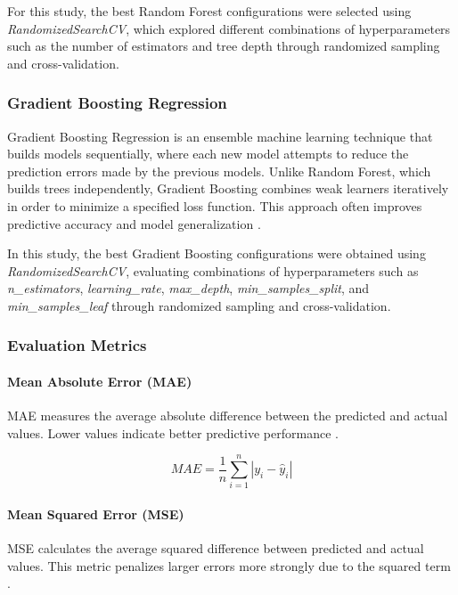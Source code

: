 \documentclass[12pt]{article}
\begin{document}
For this study, the best Random Forest configurations were selected using \textit{RandomizedSearchCV}, which explored different combinations of hyperparameters such as the number of estimators and tree depth through randomized sampling and cross-validation.

\subsubsection{Gradient Boosting Regression}

Gradient Boosting Regression is an ensemble machine learning technique that builds models sequentially, where each new model attempts to reduce the prediction errors made by the previous models. Unlike Random Forest, which builds trees independently, Gradient Boosting combines weak learners iteratively in order to minimize a specified loss function. This approach often improves predictive accuracy and model generalization \cite{ibm_gradient_boosting}.

In this study, the best Gradient Boosting configurations were obtained using \textit{RandomizedSearchCV}, evaluating combinations of hyperparameters such as \textit{n\_estimators}, \textit{learning\_rate}, \textit{max\_depth}, \textit{min\_samples\_split}, and \textit{min\_samples\_leaf} through randomized sampling and cross-validation.

\subsubsection{Evaluation Metrics}

\paragraph{Mean Absolute Error (MAE)}

MAE measures the average absolute difference between the predicted and actual values. Lower values indicate better predictive performance \cite{metrics_medium}.

\[
MAE = \frac{1}{n}\sum_{i=1}^{n}|y_i - \hat{y}_i|
\]

\paragraph{Mean Squared Error (MSE)}

MSE calculates the average squared difference between predicted and actual values. This metric penalizes larger errors more strongly due to the squared term \cite{metrics_medium}.
\end{document}
